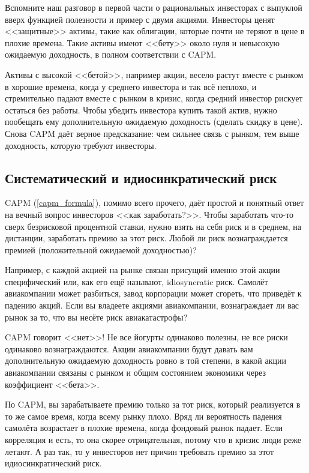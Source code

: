 Вспомните наш разговор в первой части о рациональных инвесторах с выпуклой вверх 
функцией полезности и пример с двумя акциями. Инвесторы ценят <<защитные>> 
активы, такие как облигации, которые почти не теряют в цене в плохие времена. 
Такие активы имеют <<бету>> около нуля и невысокую ожидаемую доходность, в 
полном соответствии с CAPM.

Активы с высокой <<бетой>>, например акции, весело растут вместе с рынком в 
хорошие времена, когда у среднего инвестора и так всё неплохо, и стремительно 
падают вместе с рынком в кризис, когда средний инвестор рискует остаться без 
работы. Чтобы убедить инвестора купить такой актив, нужно пообещать ему 
дополнительную ожидаемую доходность (сделать скидку в цене). Снова CAPM даёт 
верное предсказание: чем сильнее связь с рынком, тем выше доходность, которую 
требуют инвесторы.

\subsection{Систематический и идиосинкратический риск}

CAPM (\ref{capm_formula}), помимо всего прочего, даёт простой и понятный ответ 
на вечный вопрос инвесторов <<как заработать?>>. Чтобы заработать что-то сверх 
безрисковой процентной ставки, нужно взять на себя риск и в среднем, на 
дистанции, заработать премию за этот риск. Любой ли риск вознаграждается премией 
(положительной ожидаемой доходностью)?

Например, с каждой акцией на рынке связан присущий именно этой акции 
специфический или, как его ещё называют, 
{idiosyncratic} риск. Самолёт авиакомпании может разбиться, завод корпорации 
может сгореть, что приведёт к падению акций. Если вы владеете акциями 
авиакомпании, вознаграждает ли вас рынок за то, что вы несёте риск 
авиакатастрофы?

CAPM говорит <<нет>>! Не все йогурты одинаково полезны, не все риски одинаково 
вознаграждаются. Акции авиакомпании будут давать вам дополнительную ожидаемую 
доходность ровно в той степени, в какой акции авиакомпании связаны с рынком и 
общим состоянием экономики через коэффициент <<бета>>.

По CAPM, вы зарабатываете премию только за тот риск, который реализуется в то же 
самое время, когда всему рынку плохо. Вряд ли вероятность падения самолёта 
возрастает в плохие времена, когда фондовый рынок падает. Если корреляция и 
есть, то она скорее отрицательная, потому что в кризис люди реже летают. А раз 
так, то у инвесторов нет причин требовать премию за этот идиосинкратический 
риск. 

